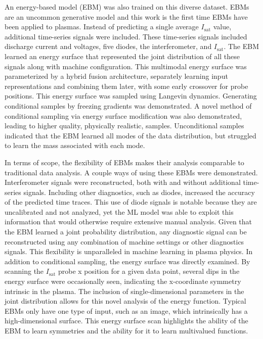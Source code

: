 An energy-based model (EBM) was also trained on this diverse dataset. EBMs are an uncommon generative model and this work is the first time EBMs have been applied to plasmas. Instead of predicting a single average $I_\text{sat}$ value, additional time-series signals were included. These time-series signals included discharge current and voltages, five diodes, the interferometer, and $I_\text{sat}$. The EBM learned an energy surface that represented the joint distribution of all these signals along with machine configuration. This multimodal energy surface was parameterized by a hybrid fusion architecture, separately learning input representations and combining them later, with some early crossover for probe positions. This energy surface was sampled using Langevin dynamics. Generating conditional samples by freezing gradients was demonstrated. A novel method of conditional sampling via energy surface modification was also demonstrated, leading to higher quality, physically realistic, samples. Unconditional samples indicated that the EBM learned all modes of the data distribution, but struggled to learn the mass associated with each mode.

In terms of scope, the flexibility of EBMs makes their analysis comparable to traditional data analysis. A couple ways of using these EBMs were demonstrated. Interferometer signals were reconstructed, both with and without additional time-series signals. Including other diagnostics, such as diodes, increased the accuracy of the predicted time traces. This use of diode signals is notable because they are uncalibrated and not analyzed, yet the ML model was able to exploit this information that would otherwise require extensive manual analysis. Given that the EBM learned a joint probability distribution, any diagnostic signal can be reconstructed using any combination of machine settings or other diagnostics signals. This flexibility is unparalleled in machine learning in plasma physics. In addition to conditional sampling, the energy surface was directly examined. By scanning the $I_\text{sat}$ probe x position for a given data point, several dips in the energy surface were occasionally seen, indicating the x-coordinate symmetry intrinsic in the plasma. The inclusion of single-dimensional parameters in the joint distribution allows for this novel analysis of the energy function. Typical EBMs only have one type of input, such as an image, which intrinsically has a high-dimensional surface. This energy surface scan highlights the ability of the EBM to learn symmetries and the ability for it to learn multivalued functions.

